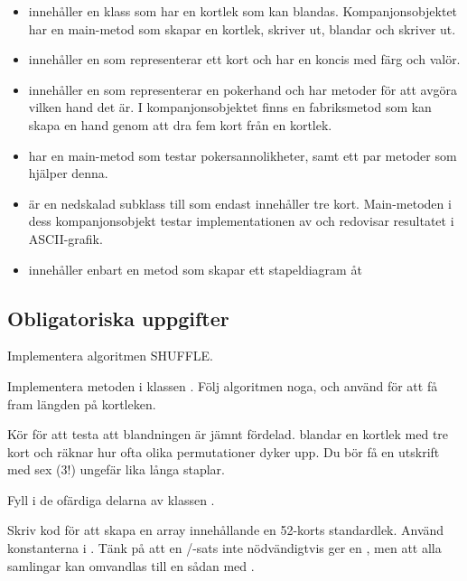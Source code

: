 \begin{itemize}
\item {} innehåller en klass som har en kortlek som kan blandas. Kompanjonsobjektet har en main-metod som skapar en kortlek, skriver ut, blandar och skriver ut.
\item {} innehåller en  som representerar ett kort och har en koncis  med färg  och valör.
\item {} innehåller en  som representerar en pokerhand och har metoder för att avgöra vilken hand det är. I kompanjonsobjektet finns en fabriksmetod som kan skapa en hand genom att dra fem kort från en kortlek.
\item {} har en main-metod som testar pokersannolikheter, samt ett par metoder som hjälper denna.
\item {} är en nedskalad subklass till  som endast innehåller tre kort. Main-metoden i dess kompanjonsobjekt testar implementationen av  och redovisar resultatet i ASCII-grafik.
\item {} innehåller enbart en metod som skapar ett stapeldiagram åt 
\end{itemize}




\subsection{Obligatoriska uppgifter}\label{subsection:lab:shuffle:tasks}

\Task Implementera algoritmen SHUFFLE.

\Subtask Implementera metoden  i klassen . Följ algoritmen noga, och använd  för att få fram längden på kortleken.

\Subtask Kör  för att testa att blandningen är jämnt fördelad.  blandar en kortlek med tre kort och räknar hur ofta olika permutationer dyker upp. Du bör få en utskrift med sex ($3!$) ungefär lika långa staplar.

\Task Fyll i de ofärdiga delarna av klassen .

\Subtask Skriv kod för att skapa en array innehållande en 52-korts standardlek. Använd konstanterna i . Tänk på att en /-sats inte nödvändigtvis ger en , men att alla samlingar kan omvandlas till en sådan med .

